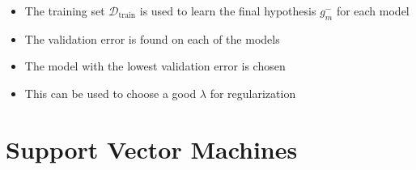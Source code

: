 \documentclass[a4, english]{article}
\begin{document}
\begin{itemize}
  \begin{itemize}
  	\item The training set $\mathcal D_\text{train}$ is used to learn the final hypothesis $g^-_m$ for each model
    \item The validation error is found on each of the models 
    \item The model with the lowest validation error is chosen 
    \item This can be used to choose a good $\lambda$ for regularization
  \end{itemize}
\end{itemize}

\newpage

\section{Support Vector Machines}
\end{document}
